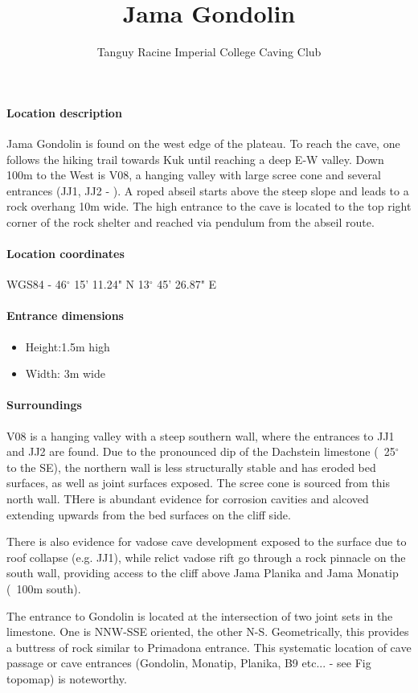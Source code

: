\documentclass[symmetric, a4paper, 11pt]{article}
\title{Jama Gondolin}
\author{Tanguy Racine Imperial College Caving Club}
\begin{document}
\maketitle
\paragraph{Location description}
Jama Gondolin is found on the west edge of the plateau. To reach the cave, one follows the hiking trail towards Kuk until reaching a deep E-W valley. Down 100m to the West is V08, a hanging valley with large scree cone and several entrances (JJ1, JJ2 - \cite{hm1}). A roped abseil starts above the steep slope and leads to a rock overhang 10m wide. The high entrance to the cave is located to the top right corner of the rock shelter and reached via pendulum from the abseil route.

\paragraph{Location coordinates} WGS84 - 46$^{\circ}$ 15' 11.24" N 13$^{\circ}$ 45' 26.87" E
\paragraph{Entrance dimensions} 
\begin{itemize}
	\item Height:1.5m high 
	\item Width: 3m wide
\end{itemize}
\paragraph{Surroundings}
V08 is a hanging valley with a steep southern wall, where the entrances to JJ1 and JJ2 are found. Due to the pronounced dip of the Dachstein limestone (~25$^{\circ}$ to the SE), the northern wall is less structurally stable and has eroded bed surfaces, as well as joint surfaces exposed. The scree cone is sourced from this north wall. THere is abundant evidence for corrosion cavities and alcoved extending upwards from the bed surfaces on the cliff side. 

There is also evidence for vadose cave development exposed to the surface due to roof collapse (e.g. JJ1), while relict vadose rift go through a rock pinnacle on the south wall, providing access to the cliff above Jama Planika and Jama Monatip (~100m south).

The entrance to Gondolin is located at the intersection of two joint sets in the limestone. One is NNW-SSE oriented, the other N-S. Geometrically, this provides a buttress of rock similar to Primadona entrance. This systematic location of cave passage or cave entrances (Gondolin, Monatip, Planika, B9 etc... - see Fig topomap) is noteworthy. 
\end{document}
